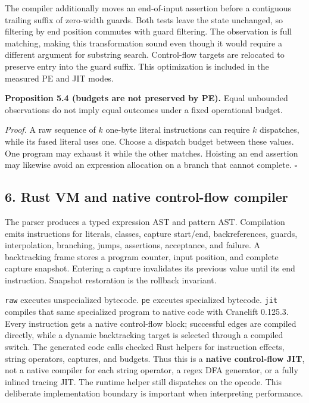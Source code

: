 \documentclass[
  11pt,
]{article}
\begin{document}
The compiler additionally moves an end-of-input assertion before a
contiguous trailing suffix of zero-width guards. Both tests leave the
state unchanged, so filtering by end position commutes with guard
filtering. The observation is full matching, making this transformation
sound even though it would require a different argument for substring
search. Control-flow targets are relocated to preserve entry into the
guard suffix. This optimization is included in the measured PE and JIT
modes.

\textbf{Proposition 5.4 (budgets are not preserved by PE).} Equal
unbounded observations do not imply equal outcomes under a fixed
operational budget.

\emph{Proof.} A raw sequence of \(k\) one-byte literal instructions can
require \(k\) dispatches, while its fused literal uses one. Choose a
dispatch budget between these values. One program may exhaust it while
the other matches. Hoisting an end assertion may likewise avoid an
expression allocation on a branch that cannot complete. \(\square\)

\hypertarget{rust-vm-and-native-control-flow-compiler}{%
\subsection{6. Rust VM and native control-flow
compiler}\label{rust-vm-and-native-control-flow-compiler}}

The parser produces a typed expression AST and pattern AST. Compilation
emits instructions for literals, classes, capture start/end,
backreferences, guards, interpolation, branching, jumps, assertions,
acceptance, and failure. A backtracking frame stores a program counter,
input position, and complete capture snapshot. Entering a capture
invalidates its previous value until its end instruction. Snapshot
restoration is the rollback invariant.

\texttt{raw} executes unspecialized bytecode. \texttt{pe} executes
specialized bytecode. \texttt{jit} compiles that same specialized
program to native code with Cranelift 0.125.3. Every instruction gets a
native control-flow block; successful edges are compiled directly, while
a dynamic backtracking target is selected through a compiled switch. The
generated code calls checked Rust helpers for instruction effects,
string operators, captures, and budgets. Thus this is a \textbf{native
control-flow JIT}, not a native compiler for each string operator, a
regex DFA generator, or a fully inlined tracing JIT. The runtime helper
still dispatches on the opcode. This deliberate implementation boundary
is important when interpreting performance.
\end{document}
